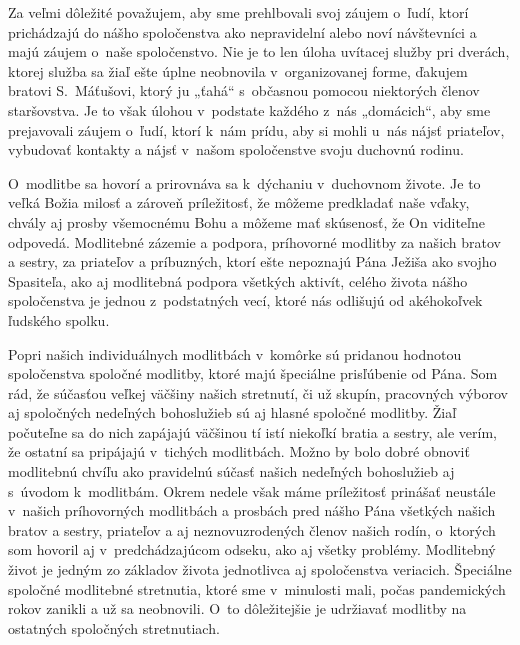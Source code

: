 Za veľmi dôležité považujem, aby sme prehlbovali svoj záujem o~ľudí, ktorí prichádzajú do nášho spoločenstva ako nepravidelní alebo noví návštevníci a majú záujem o~naše spoločenstvo. Nie je to len úloha uvítacej služby pri dverách, ktorej služba sa žiaľ ešte úplne neobnovila v~organizovanej forme, ďakujem bratovi S.~Máťušovi, ktorý ju „ťahá“ s~občasnou pomocou niektorých členov staršovstva. Je to však úlohou v~podstate každého z~nás „domácich“, aby sme prejavovali záujem o~ľudí, ktorí k~nám prídu, aby si mohli u~nás nájsť priateľov, vybudovať kontakty a nájsť v~našom spoločenstve svoju duchovnú rodinu.


O~modlitbe sa hovorí a prirovnáva sa k~dýchaniu v~duchovnom živote. Je to veľká Božia milosť a zároveň príležitosť, že môžeme predkladať naše vďaky, chvály aj prosby všemocnému Bohu a môžeme mať skúsenosť, že On viditeľne odpovedá. Modlitebné zázemie a podpora, príhovorné modlitby za našich bratov a sestry, za priateľov a príbuzných, ktorí ešte nepoznajú Pána Ježiša ako svojho Spasiteľa, ako aj modlitebná podpora všetkých aktivít, celého života nášho spoločenstva je jednou z~podstatných vecí, ktoré nás odlišujú od akéhokoľvek ľudského spolku.

Popri našich individuálnych modlitbách v~komôrke sú pridanou hodnotou spoločenstva spoločné modlitby, ktoré majú špeciálne prisľúbenie od Pána. Som rád, že súčasťou veľkej väčšiny našich stretnutí, či už skupín, pracovných výborov aj spoločných nedeľných bohoslužieb sú aj hlasné spoločné modlitby. Žiaľ počuteľne sa do nich zapájajú väčšinou tí istí niekoľkí bratia a sestry, ale verím, že ostatní sa pripájajú v~tichých modlitbách.
Možno by bolo dobré obnoviť modlitebnú chvíľu ako pravidelnú súčasť našich nedeľných bohoslužieb aj s~úvodom k~modlitbám.
Okrem nedele však máme príležitosť prinášať neustále v~našich príhovorných modlitbách a prosbách pred nášho Pána všetkých našich bratov a sestry, priateľov a aj neznovuzrodených členov našich rodín, o~ktorých som hovoril aj v~predchádzajúcom odseku, ako aj všetky problémy. Modlitebný život je jedným zo základov života jednotlivca aj spoločenstva veriacich.
Špeciálne spoločné modlitebné stretnutia, ktoré sme v~minulosti mali, počas pandemických rokov zanikli a už sa neobnovili.
O~to dôležitejšie je udržiavať modlitby na ostatných spoločných stretnutiach.

